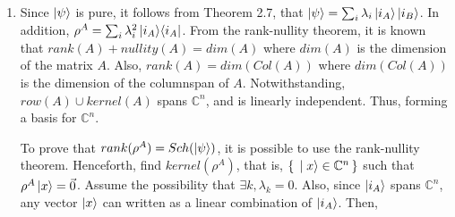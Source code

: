 \begin{enumerate}
    \item Since $\ket{\psi}$ is pure, it follows from Theorem 2.7, that
    $\ket{\psi} = \sum_i \lambda_i \ket{i_A} \ket{i_B}$.
    In addition, $\rho^A = \sum_i \lambda_i^2 \mathop{\mathinner{ |{i_A}\rangle \langle{i_A}|}}$.
    From the rank-nullity theorem, it is known that
    $rank(A) + nullity(A) = dim(A)$ where $dim(A)$ is the dimension of the matrix $A$.
    Also, $rank(A) = dim(Col(A))$ where $dim(Col(A))$ is the dimension of the columnspan of $A$.
    Notwithstanding, $row(A) \cup kernel(A)$ spans $\mathbb{C}^n$, and is linearly independent.
    Thus, forming a basis for $\mathbb{C}^n$.
    
\begin{comment}
    Prove that $rank(\rho^A) = Sch(\rho^A) = n$ if $\lambda_i \neq 0\ \forall i$.
    If that is the case, then $\rho^A \ket{x} = \vec{0}$ if and only if $\ket{x} = \vec{0}$.
    Since $\ket{i_A}$ spans $\mathbb{C}^n$,
    then any vector $\ket{x}$ can written as a linear combination of $\ket{i_A}$.
    
    \begin{align}
        \left( \sum_i \lambda_i^2 \ketbra{i_A}{i_A} \right) \ket{x}
        &= \left( \sum_i \lambda_i^2 \ketbra{i_A}{i_A} \right) \sum_j x_j \ket{j_A} \\
        = \sum_{ij} \lambda_i^2 x_j \ket{i_A} \braket{i_A}{j_A}
        &= \sum_j \lambda_j^2 x_j \ket{j_A}
    \end{align}
    
    Since $\ket{j_A}$ is a orthonormal basis for $\mathbb{C}^n$,
    and $\lambda_j^2 \neq 0\ \forall j$,
    the only possible way to obtain $\vec{0}$ is $x_j = 0\ \forall j$.
    The converse is trivial ($\rho^A \vec{0} = \vec{0}$).
    
    Yet, it is necessary to prove $rank(\rho^A) = Sch(\rho^A)$ when
    $\exists k, \lambda_k = 0$.
    This is similar to prove that $rank(\rho^A)$ diminishes by
    the respective number of $\lambda_k$ that equals $0$.
    Alternatively, $nullity(\rho^A)$ will increase by the same amount.
\end{comment}

    To prove that $rank(\rho^A) = Sch(\ket{\psi})$,
    it is possible to use the rank-nullity theorem.
    Henceforth, find $kernel(\rho^A)$,
    that is, $\set{\ket{x} \in \mathbb{C}^n}$ such that $\rho^A \ket{x} = \vec{0}$.
    Assume the possibility that $\exists k, \lambda_k = 0$.
    Also, since $\ket{i_A}$ spans $\mathbb{C}^n$,
    any vector $\ket{x}$ can written as a linear combination of $\ket{i_A}$.
    Then,
    

\end{enumerate}
